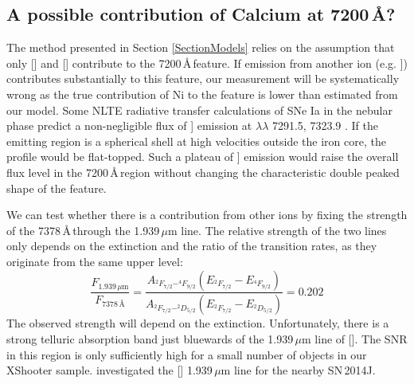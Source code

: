 \documentclass[fleqn,usenatbib]{mnras}
\begin{document}

\subsection{A possible contribution of Calcium at 7200\,\AA?}
\label{Catest}
The method presented in Section \ref{SectionModels} relies on the assumption that only [] and [] contribute to the 7200\,\AA\,feature. If emission from another ion (e.g. ])  contributes substantially to this feature, our measurement will be systematically wrong as the true contribution of Ni to the feature is lower than estimated from our model. Some NLTE radiative transfer calculations of SNe Ia in the nebular phase predict a non-negligible flux of ] emission at $\lambda\lambda$ 7291.5,  7323.9 \citep{2017ApJ...845..176B}. If the emitting region is a spherical shell at high velocities outside the iron core, the profile would be flat-topped. Such a plateau of ] emission would raise the overall flux level in the 7200\,\AA\,region without changing the characteristic double peaked shape of the feature.

We can test whether there is a contribution from other ions by fixing the strength of the  7378\,\AA\,through the 1.939\,$\mu$m line. The relative strength of the two lines only depends on the extinction and the ratio of the transition rates, as they originate from the same upper level:
\begin{equation}
    \frac{F_{1.939\,\mu\text{m}}}{F_{7378\,\text{\AA}}} = \frac{A_{^2F_{7/2} - ^4F_{9/2}}(E_{^2F_{7/2}} - E_{^4F_{9/2}})}{A_{^2F_{7/2} - ^2D_{5/2}} (E_{^2F_{7/2}} - E_{^2D_{5/2}})} = 0.202
\end{equation}
The observed strength will depend on the extinction. Unfortunately, there is a strong telluric absorption band just bluewards of the 1.939\,$\mu$m line of []. The SNR in this region is only sufficiently high for a small number of objects in our XShooter sample.  \citet{2018A&A...619A.102D} investigated the [] 1.939\,$\mu$m line for the nearby SN\,2014J.
\end{document}
